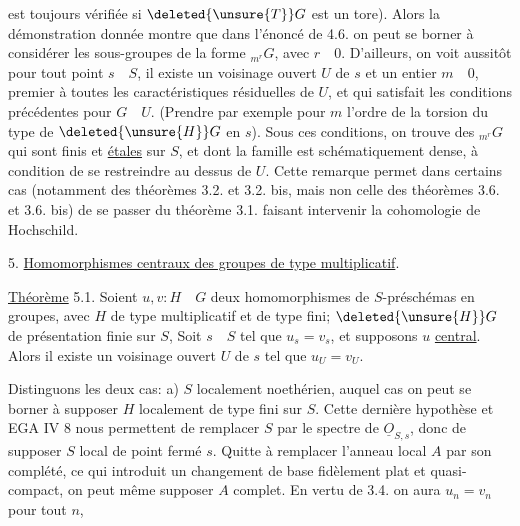 est toujours vérifiée si $\deleted{\unsure{T}}G$ est un tore). Alors la démonstration donnée montre que dans l'énoncé de 4.6.  on peut se borner à considérer les sous-groupes de la forme $ {}_{m^{r}}\!G$, avec $r\quad 0$. D'ailleurs, on voit aussitôt   pour tout point $s\quad S$, il existe un voisinage ouvert $U$ de $s$  et un entier $m\quad 0$, premier à toutes les caractéristiques  résiduelles de $U$, et qui satisfait les conditions précédentes pour $G\quad U$. (Prendre par exemple pour $m$ l'ordre de la torsion du type de $\deleted{\unsure{H}}G$  en $s$). Sous ces conditions, on trouve des $ {}_{m^{r}}\!G$ qui sont finis et \uline{étales} sur $S$, et dont la famille est schématiquement dense, à condition de se restreindre au dessus de $U$. Cette remarque permet dans certains cas (notamment   des théorèmes 3.2. et 3.2. bis,   mais non celle des théorèmes 3.6. et 3.6. bis) de se passer du théorème 3.1. faisant intervenir la cohomologie de Hochschild. 

5. \uline{Homomorphismes centraux des groupes de type multiplicatif}.

\uline{Théorème} 5.1. Soient $u,v:H\quad G$ deux homomorphismes de $S$-préschémas en groupes, avec $H$ de type multiplicatif et de type fini;  $\deleted{\unsure{H}}G$ de présentation finie sur $S$,  Soit $s\quad S$ tel que $u_{s}=v_{s}$, et supposons $u$ \uline{central}. Alors il existe un voisinage ouvert $U$ de $s$ tel que $u_{U}=v_{U}$.

Distinguons les deux cas: a) $S$ localement noethérien, auquel cas on peut se borner à supposer $H$ localement de type fini sur $S$. Cette dernière hypothèse et EGA IV 8 nous permettent de remplacer $S$ par le spectre de $\underline{O}_{S,s}$, donc de supposer $S$ local de point fermé $s$. Quitte à remplacer l'anneau local $A$ par son complété, ce qui introduit un changement de base fidèlement plat et quasi-compact, on peut même supposer $A$ complet. En vertu de 3.4. on aura $u_{n}=v_{n}$ pour tout $n$,


